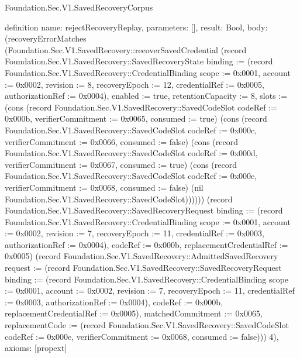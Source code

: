 \begin{lexlean}{Foundation.Sec.V1.SavedRecoveryCorpus}
\begin{semanticmodule}
definition{
  name: rejectRecoveryReplay,
  parameters: [],
  result: Bool,
  body: (recoveryErrorMatches (Foundation.Sec.V1.SavedRecovery::recoverSavedCredential (record Foundation.Sec.V1.SavedRecovery::SavedRecoveryState {binding := (record Foundation.Sec.V1.SavedRecovery::CredentialBinding {scope := 0x0001, account := 0x0002, revision := 8, recoveryEpoch := 12, credentialRef := 0x0005, authorizationRef := 0x0004}), enabled := true, retentionCapacity := 8, slots := (cons (record Foundation.Sec.V1.SavedRecovery::SavedCodeSlot {codeRef := 0x000b, verifierCommitment := 0x0065, consumed := true}) (cons (record Foundation.Sec.V1.SavedRecovery::SavedCodeSlot {codeRef := 0x000c, verifierCommitment := 0x0066, consumed := false}) (cons (record Foundation.Sec.V1.SavedRecovery::SavedCodeSlot {codeRef := 0x000d, verifierCommitment := 0x0067, consumed := true}) (cons (record Foundation.Sec.V1.SavedRecovery::SavedCodeSlot {codeRef := 0x000e, verifierCommitment := 0x0068, consumed := false}) (nil Foundation.Sec.V1.SavedRecovery::SavedCodeSlot)))))}) (record Foundation.Sec.V1.SavedRecovery::SavedRecoveryRequest {binding := (record Foundation.Sec.V1.SavedRecovery::CredentialBinding {scope := 0x0001, account := 0x0002, revision := 7, recoveryEpoch := 11, credentialRef := 0x0003, authorizationRef := 0x0004}), codeRef := 0x000b, replacementCredentialRef := 0x0005}) (record Foundation.Sec.V1.SavedRecovery::AdmittedSavedRecovery {request := (record Foundation.Sec.V1.SavedRecovery::SavedRecoveryRequest {binding := (record Foundation.Sec.V1.SavedRecovery::CredentialBinding {scope := 0x0001, account := 0x0002, revision := 7, recoveryEpoch := 11, credentialRef := 0x0003, authorizationRef := 0x0004}), codeRef := 0x000b, replacementCredentialRef := 0x0005}), matchedCommitment := 0x0065, replacementCode := (record Foundation.Sec.V1.SavedRecovery::SavedCodeSlot {codeRef := 0x000e, verifierCommitment := 0x0068, consumed := false})})) 4),
  axioms: [propext]
}


\end{semanticmodule}
\end{lexlean}
